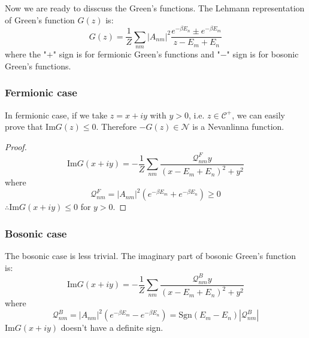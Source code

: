\documentclass[
	preprint,%
	aps,
	prb,
	showpacs,	
	amsmath, amssymb]{revtex4-2}
\newcommand{\im}{ {\mathrm{Im}} }
\newcommand{\sgn}{ {\mathrm{Sgn}} }
\newcommand{\C}{ {\mathcal{C}} }
\newcommand{\N}{ {\mathcal{N}} }
\begin{document}
Now we are ready to disscuss the Green's functions. The Lehmann 
representation of Green's function $G(z)$ is:
\begin{equation}\label{eq:Lehmann-GF-Masubara}
	G(z) = \frac{1}{Z} \sum_{nm} |A_{nm}|^2
		\frac{e^{-\beta E_n} \pm e^{-\beta E_m} }{z - E_m + E_n}
\end{equation}
where the "$+$" sign is for fermionic Green's functions and 
"$-$" sign is for bosonic Green's functions.

\subsubsection{Fermionic case}
\label{eq:fermionic-case}
In fermionic case, if we take $z = x + iy$ with $y>0$, 
i.e. $z\in \C^+$, we can easily prove that $\im G(z) \leq 0$.
Therefore $-G(z) \in \N$ is a Nevanlinna function.
\begin{proof}
	\begin{equation}
	\im G(x+iy) = - \frac{1}{Z} \sum_{nm}
	\frac{\mathcal{Q}^F_{nm} y}{(x - E_m + E_n)^2 + y^2}
	\end{equation}
where
\begin{equation}
	\mathcal{Q}^F_{nm} = |A_{nm}|^2 (e^{-\beta E_m} + e^{-\beta E_n}) \geq 0
\end{equation}
$\therefore \im G(x+iy) \leq 0$ for $y > 0$.
\end{proof}


\subsubsection{Bosonic case}
\label{eq:bosonic-case}
The bosonic case is less trivial. 
The imaginary part of bosonic Green's function is:
\begin{equation}
	\im G(x+iy) = - \frac{1}{Z} \sum_{nm}
	\frac{\mathcal{Q}^B_{nm} y}{(x - E_m + E_n)^2 + y^2}
	\end{equation}
where
\begin{equation}
	\mathcal{Q}^B_{nm} = |A_{nm}|^2 (e^{-\beta E_m} - e^{-\beta E_n})
	=\sgn(E_m-E_n) |\mathcal{Q}^B_{nm}|
\end{equation}
$\im G(x+iy)$ doesn't have a definite sign.
\end{document}
